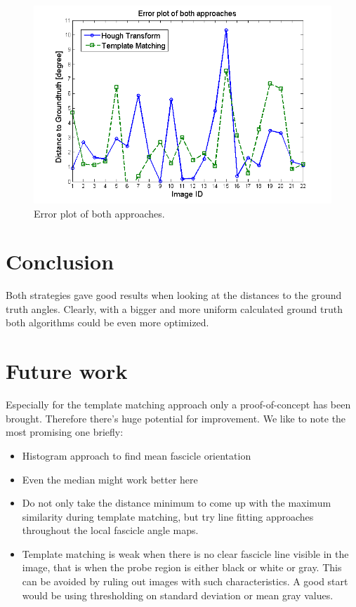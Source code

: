 \documentclass[10pt,twocolumn,letterpaper]{article}
\begin{document}
\begin{figure}
	\begin{center}		
		\includegraphics[width=1\linewidth]{img/ErrorPlotFinal}
	\end{center}
	\caption{Error plot of both approaches.}
	\label{fig:errorPlot}
	
\end{figure}


\section{Conclusion}
Both strategies gave good results when looking at the distances to the ground truth angles. Clearly, with a bigger and more uniform calculated ground truth  both algorithms could be even more optimized.

\section{Future work}
\label{sec:future}
Especially for the template matching approach only a proof-of-concept has been brought. Therefore there's huge potential for improvement. We like to note the most promising one briefly:

\begin{itemize}
	\item Histogram approach to find mean fascicle orientation
	\item Even the median might work better here
	\item Do not only take the distance minimum to come up with the maximum similarity during template matching, but try line fitting approaches throughout the local fascicle angle maps.
	\item Template matching is weak when there is no clear fascicle line visible in the image, that is when the probe region is either black or white or gray. This can be avoided by ruling out images with such characteristics. A good start would be using thresholding on standard deviation or mean gray values.
\end{itemize}
\end{document}
